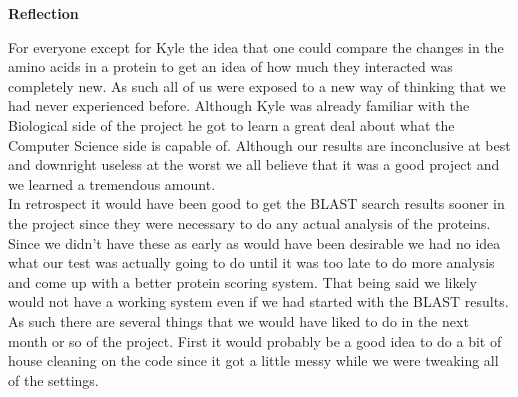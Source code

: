 \documentclass[11pt]{article}
\begin{document}
\newpage

\begin{center}
\textbf{Reflection}
\end{center}


For everyone except for Kyle the idea that one could compare the
changes in the amino acids in a protein to get an idea of how much
they interacted was completely new. As such all of us were exposed to
a new way of thinking that we had never experienced before. Although
Kyle was already familiar with the Biological side of the project he
got to learn a great deal about what the Computer Science side is
capable of. Although our results are inconclusive at best and
downright useless at the worst we all believe that it was a good
project and we learned a tremendous amount. \\

In retrospect it would have been good to get the BLAST search results
sooner in the project since they were necessary to do any actual
analysis of the proteins. Since we didn't have these as early as would
have been desirable we had no idea what our test was actually going to
do until it was too late to do more analysis and come up with a better
protein scoring system. That being said we likely would not have a
working system even if we had started with the BLAST results. \\

As such there are several things that we would have liked to do in the
next month or so of the project. First it would probably be a good
idea to do a bit of house cleaning on the code since it got a little
messy while we were tweaking all of the settings. \\
\end{document}
